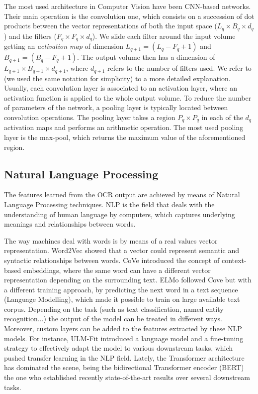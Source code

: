 \documentclass[runningheads]{llncs}
\begin{document}
The most used architecture in Computer Vision have been CNN-based networks. Their main operation is the convolution one, which consists on a succession of dot products between the vector representations of both the input space ($L_{q} \times B_{q} \times d_{q}$) and the filters ($F_{q} \times F_{q} \times d_{q}$). We slide each filter around the input volume getting an \textit{activation map} of dimension $L_{q+1} = (L_{q} - F_{q} + 1)$ and $B_{q+1} = (B_{q} - F_{q} + 1)$. The output volume then has a dimension of $L_{q+1} \times B_{q+1} \times d_{q+1}$, where $d_{q+1}$ refers to the number of filters used. We refer to \cite{charu} (we used the same notation for simplicity) to a more detailed explanation. Usually, each convolution layer is associated to an activation layer, where an activation function is applied to the whole output volume. To reduce the number of parameters of the network, a pooling layer is typically located between convolution operations. The pooling layer takes a region $P_{q} \times P_{q}$ in each of the $d_{q}$ activation maps and performs an arithmetic operation. The most used pooling layer is the max-pool, which returns the maximum value of the aforementioned region.

\subsection{Natural Language Processing}

The features learned from the OCR output are achieved by means of Natural Language Processing techniques. NLP is the field that deals with the understanding of human language by computers, which captures underlying meanings and relationships between words.

The way machines deal with words is by means of a real values vector representation. Word2Vec \cite{word2vec} showed that a vector could represent semantic and syntactic relationships between words. CoVe \cite{mccann2017learned} introduced the concept of context-based embeddings, where the same word can have a different vector representation depending on the surrounding text. ELMo \cite{Peters:2018} followed Cove but with a different training approach, by predicting the next word in a text sequence (Language Modelling), which made it possible to train on large available text corpus. Depending on the task (such as text classification, named entity recognition...) the output of the model can be treated in different ways. Moreover, custom layers can be added to the features extracted by these NLP models. For instance,  ULM-Fit \cite{ulmfit} introduced a language model and a fine-tuning strategy to effectively adapt the model to various downstream tasks, which pushed transfer learning in the NLP field. Lately, the Transformer architecture \cite{NIPS2017_7181} has dominated the scene, being the bidirectional Transformer encoder (BERT) \cite{BERT} the one who established recently state-of-the-art results over several downstream tasks.
\end{document}
